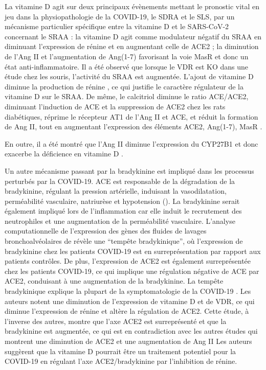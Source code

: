 \documentclass[
  a4paper,
  DIV=11,
  numbers=noendperiod,
  listof=totoc]{scrreprt}
\begin{document}
La vitamine D agit sur deux principaux évènements mettant le pronostic
vital en jeu dans la physiopathologie de la \ac{COVID-19}, le \ac{SDRA}
et le \ac{SLS}, par un mécanisme particulier spécifique entre la
vitamine D et le \ac{SARS-CoV-2} \autocite{Borsche.2021} concernant le
\ac{SRAA} : la vitamine D agit comme modulateur négatif du \ac{SRAA} en
diminuant l'expression de rénine et en augmentant celle de \ac{ACE2} ;
la diminution de l'\ac{Ang II} et l'augmentation de \ac{Ang(1-7)}
favorisant la voie \ac{MasR} et donc un état anti-inflammatoire. Il a
été observé que lorsque le \ac{VDR} est KO dans une étude chez les
souris, l'activité du \ac{SRAA} est augmentée. L'ajout de vitamine D
diminue la production de rénine \autocite{Li.2002}, ce qui justifie le
caractère régulateur de la vitamine D sur le \ac{SRAA}. De même, le
calcitriol diminue le ratio \ac{ACE}/\ac{ACE2}, diminuant l'induction de
\ac{ACE} et la suppression de \ac{ACE2} chez les rats diabétiques,
réprime le récepteur AT1 de l'\ac{Ang II} et \ac{ACE}, et réduit la
formation de \ac{Ang II}, tout en augmentant l'expression des éléments
\ac{ACE2}, \ac{Ang(1-7)}, \ac{MasR} \autocite{Mahdavi.2020}.

En outre, il a été montré que l'\ac{Ang II} diminue l'expression du
\ac{CYP27B1} et donc exacerbe la déficience en vitamine D
\autocite{Borst.2011}.

Un autre mécanisme passant par la bradykinine est impliqué dans les
processus perturbés par la \ac{COVID-19}. \ac{ACE} est responsable de la
dégradation de la bradykinine, régulant la pression artérielle,
induisant la vasodilatation, perméabilité vasculaire, natriurèse et
hypotension (). La bradykinine serait également
impliqué lors de l'inflammation car elle induit le recrutement des
neutrophiles et une augmentation de la perméabilité vasculaire.
L'analyse computationnelle de l'expression des gènes des fluides de
lavages bronchoalvéolaires de \textcite{Garvin.2020} révèle une
``tempête bradykinique'', où l'expression de bradykinine chez les
patients \ac{COVID-19} est en surreprésentation par rapport aux patients
contrôles. De plus, l'expression de \ac{ACE2} est également
surreprésentée chez les patients \ac{COVID-19}, ce qui implique une
régulation négative de \ac{ACE} par \ac{ACE2}, conduisant à une
augmentation de la bradykinine. La tempête bradykinique explique la
plupart de la symptomatologie de la \ac{COVID-19}
\autocite{Garvin.2020}. Les auteurs notent une diminution de
l'expression de vitamine D et de VDR, ce qui diminue l'expression de
rénine et altère la régulation de ACE2. Cette étude, à l'inverse des
autres, montre que l'axe \ac{ACE2} est surreprésenté et que la
bradykinine est augmentée, ce qui est en contradiction avec les autres
études qui montrent une diminution de ACE2 et une augmentation de Ang II
Les auteurs suggèrent que la vitamine D pourrait être un traitement
potentiel pour la \ac{COVID-19} en régulant l'axe ACE2/bradykinine par
l'inhibition de rénine.
\end{document}
